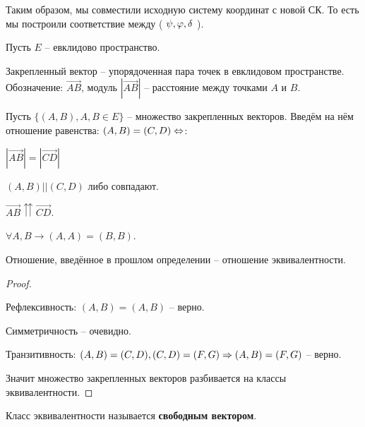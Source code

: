 	\begin{figure}[H]
		\centering
		\def\svgwidth{0.3\columnwidth}
		
	\end{figure}

	Таким образом, мы совместили исходную систему координат с новой СК. То есть
	мы построили соответствие между ( $\psi, \varphi, \delta$ ).
	

	Пусть $E$ -- евклидово пространство.
	\begin{Def}
		Закрепленный вектор -- упорядоченная пара точек в евклидовом пространстве.
		Обозначение: $\overrightarrow{AB}$, модуль $|\overrightarrow{AB}|$ -- расстояние между точками $A$ и $B$.
	\end{Def}

	\begin{Def}
		Пусть $\{(A, B), A, B \in E\}$ -- множество закрепленных векторов. Введём на нём отношение равенства:
		$(A, B) = (C, D) \Leftrightarrow$:
		\begin{MyList}
			\item $|\overrightarrow{AB}| = |\overrightarrow{CD}|$ 
			\item $(A, B) || (C, D)$ либо совпадают.
			\item $\overrightarrow{AB} \upuparrows \overrightarrow{CD}$. 
		\end{MyList}
	\end{Def}

	\begin{Rem}
		$\forall A, B \to (A, A) = (B, B)$.
	\end{Rem}

	\begin{Prop}
		Отношение, введённое в прошлом определении -- отношение эквивалентности.
	\end{Prop}

	\begin{proof}
		\begin{MyList}
			\item Рефлексивность: $(A, B) = (A, B)$ -- верно.
			\item Симметричность -- очевидно.
			\item Транзитивность: $(A, B) = (C, D), (C, D) = (F, G) \Rightarrow (A, B) = (F, G)$ -- верно.
		\end{MyList}
		Значит множество закрепленных векторов разбивается на классы эквивалентности.
	\end{proof}

	\begin{Def}
		Класс эквивалентности называется \textbf{свободным вектором}.
	\end{Def}

